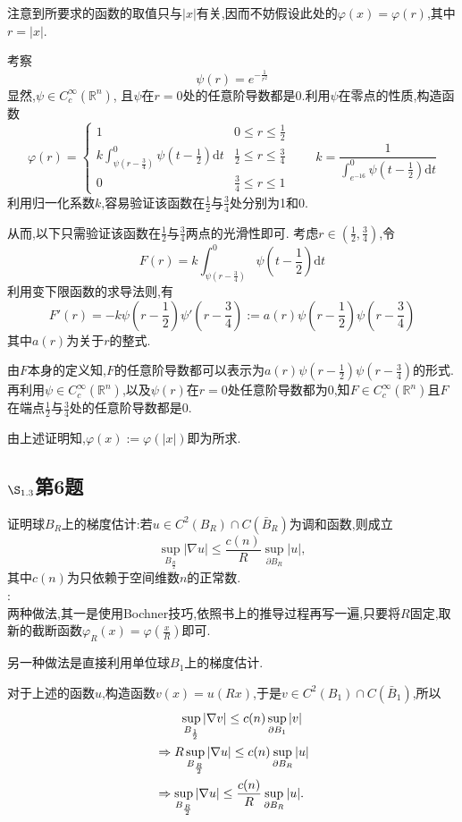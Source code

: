 \documentclass[12pt, a4paper]{ctexbook}
\newcommand{\dt}{\text{d}t}
\begin{document}
    注意到所要求的函数的取值只与$|x|$有关,因而不妨假设此处的$\varphi(x)=\varphi(r)$,其中$r=|x|$.
    
    考察$$
    \psi(r)=e^{-\frac{1}{r^2}} $$
    显然,$\psi \in C_{c}^{\infty}(\mathbb{R}^n)$,
    且$\psi$在$r=0$处的任意阶导数都是0.利用$\psi$在零点的性质,构造函数$$
    \varphi(r)=\begin{cases}
    1 &  0 \le r \le \frac{1}{2}\\
    k\int_{\psi(r-\frac{3}{4})}^{0}\psi(t-\frac{1}{2})\dt &  \frac{1}{2} \le r \le \frac{3}{4}\\
    0 &  \frac{3}{4} \le r \le 1
    \end{cases}    \qquad k=\frac{1}{\int_{e^{-16}}^{0}\psi(t-\frac{1}{2})\dt}$$
    利用归一化系数$k$,容易验证该函数在$\frac{1}{2}$与$\frac{3}{4}$处分别为1和0.
    
    从而,以下只需验证该函数在$\frac{1}{2}$与$\frac{3}{4}$两点的光滑性即可.
    考虑$r \in (\frac{1}{2},\frac{3}{4})$,令$$
    F(r)=k\int_{\psi(r-\frac{3}{4})}^{0}\psi(t-\frac{1}{2})\dt$$
    利用变下限函数的求导法则,有$$
    F'(r)=-k\psi(r-\frac{1}{2})\psi'(r-\frac{3}{4}):=a(r)\psi(r-\frac{1}{2})\psi(r-\frac{3}{4})$$
    其中$a(r)$为关于$r$的整式.
    
    由$F$本身的定义知,$F$的任意阶导数都可以表示为$a(r)\psi(r-\frac{1}{2})\psi(r-\frac{3}{4})$的形式.再利用$\psi \in C_{c}^{\infty}(\mathbb{R}^n)$,以及$\psi (r)$在$r=0$处任意阶导数都为0,知$F \in C_{c}^{\infty}(\mathbb{R}^n)$且$F$在端点$\frac{1}{2}$与$\frac{3}{4}$处的任意阶导数都是0.
    
    由上述证明知,$\varphi(x):=\varphi(|x|)$即为所求.
    
    
    \subsection{$\S_{1.3}$第6题}
    \kaishu{}证明球$B_R$上的梯度估计:若$u \in C^2(B_R) \cap C(\bar{B}_R)$为调和函数,则成立$$
    \sup_{B_{\frac{R}{2}}} |\nabla u| \le \frac{c(n)}{R} \sup_{\partial B_R}|u|, $$
    其中$c(n)$为只依赖于空间维数$n$的正常数.\\
    
    \songti{}:\\
    
    两种做法,其一是使用Bochner技巧,依照书上的推导过程再写一遍,只要将$R$固定,取新的截断函数$\varphi_R(x)=\varphi\left(\frac{x}{R} \right)$即可.
    
    另一种做法是直接利用单位球$B_1$上的梯度估计.
    
    对于上述的函数$u$,构造函数$v(x)=u(Rx)$,于是$v \in C^2(B_1) \cap C(\bar{B}_1)$,所以
    \begin{align}
    &\qquad \sup_{B_{\frac{1}{2}}} |\nabla v| \le c(n) \sup_{\partial B_1}|v| \notag \\
    &\Rightarrow R \sup_{B_{\frac{R}{2}}} |\nabla u| \le c(n) \sup_{\partial B_R}|u| \notag \\
    &\Rightarrow \sup_{B_{\frac{R}{2}}} |\nabla u| \le \frac{c(n)}{R} \sup_{\partial B_R}|u| \notag.
    \end{align} \\
    
\end{document}
